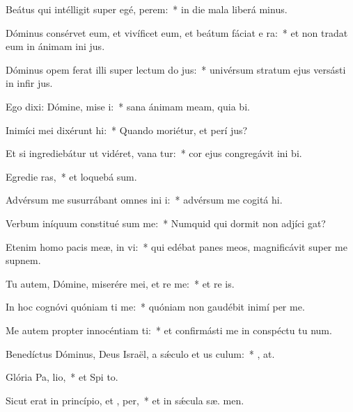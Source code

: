 \item Beátus qui intélligit super egé,  perem:~* in die mala liberá  minus.
\item Dóminus consérvet eum, et vivíficet eum, et beátum fáciat e  ra:~* et non tradat eum in ánimam ini jus.
\item Dóminus opem ferat illi super lectum do jus:~* univérsum stratum ejus versásti in infir jus.
\item Ego dixi: Dómine, mise i:~* sana ánimam meam, quia  bi.
\item Inimíci mei dixérunt  hi:~* Quando moriétur, et perí  jus?
\item Et si ingrediebátur ut vidéret, vana tur:~* cor ejus congregávit ini bi.
\item Egredie ras,~* et loquebá  sum.
\item Advérsum me susurrábant omnes ini i:~* advérsum me cogitá  hi.
\item Verbum iníquum constitué sum me:~* Numquid qui dormit non adjíci  gat?
\item Etenim homo pacis meæ, in  vi:~* qui edébat panes meos, magnificávit super me supnem.
\item Tu autem, Dómine, miserére mei, et re me:~* et re is.
\item In hoc cognóvi quóniam ti me:~* quóniam non gaudébit inimí  per me.
\item Me autem propter innocéntiam ti:~* et confirmásti me in conspéctu tu  num.
\item Benedíctus Dóminus, Deus Israël, a sǽculo et us  culum:~* , at.
\item Glória Pa,  lio,~* et Spi to.
\item Sicut erat in princípio, et ,  per,~* et in sǽcula sæ. men.
